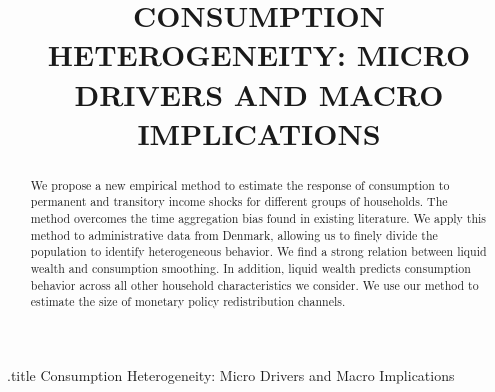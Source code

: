 \documentclass[titlepage]{\econtex}\newcommand{\texname}{ConsumptionHeterogeneity}
\begin{document}

	
	\begin{verbatimwrite}{\jobname.title}
		Consumption Heterogeneity: Micro Drivers and Macro Implications
	\end{verbatimwrite}
	
	
	\title{ 
		CONSUMPTION HETEROGENEITY: MICRO DRIVERS AND MACRO IMPLICATIONS}
	
	
	
	\maketitle
	
	
	\begin{abstract}
		We propose a new empirical method to estimate the response of consumption to permanent and transitory income shocks for different groups of households. The method overcomes the time aggregation bias found in existing literature. We apply this method to administrative data from Denmark, allowing us to finely divide the population to identify heterogeneous behavior. We find a strong relation between liquid wealth and consumption smoothing. In addition, liquid wealth predicts consumption behavior across all other household characteristics we consider. We use our method to estimate the size of monetary policy redistribution channels.
	\end{abstract}
	
\end{document}
